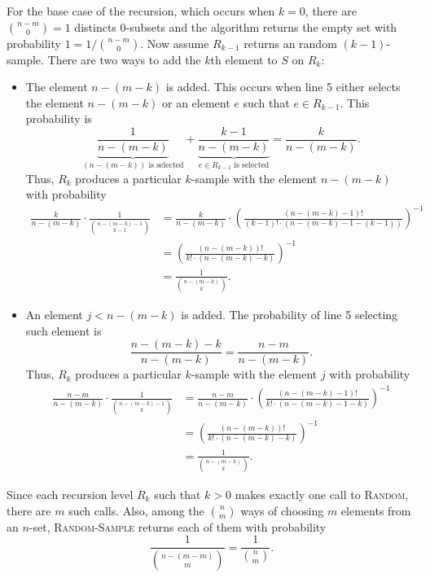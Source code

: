 \begin{enumerate}
\begin{framed}
For the base case of the recursion, which occurs when $k = 0$, there are
$\binom{n - m}{0} = 1$ distincts $0$-subsets and the algorithm returns the empty
set with probability $1 = 1/\binom{n - m}{0}$. Now assume $R_{k - 1}$ returns an
random $(k - 1)$-sample. There are two ways to add the $k$th element to $S$ on
$R_k$:
\begin{itemize}
\item The element $n - (m - k)$ is added. This occurs when line 5 either
selects the element $n - (m - k)$ or an element $e$ such that $e \in R_{k - 1}$.
This probability is
\[
  \underbrace{\frac{1}{n - (m - k)}}_\text{$(n - (m - k))$ is selected} +
  \underbrace{\frac{k - 1}{n - (m - k)}}_\text{$e \in R_{k - 1}$ is selected} = \frac{k}{n - (m - k)}.
\]
Thus, $R_k$ produces a particular $k$-sample with the element $n - (m - k)$ with
probability
\begin{equation*}
\begin{aligned}
  \frac{k}{n - (m - k)} \cdot \frac{1}{\binom{n - (m - k) - 1}{k - 1}}
  &= \frac{k}{n - (m - k)} \cdot \left(\frac{(n - (m - k) - 1)!}{(k - 1)! \cdot (n - (m - k) - 1 - (k - 1))}\right)^{-1}\\
  &= \left(\frac{(n - (m - k))!}{k! \cdot (n - (m - k) - k )}\right)^{-1}\\
  &= \frac{1}{\binom{n - (m - k)}{k}}.
\end{aligned}
\end{equation*}

\item An element $j < n - (m - k)$ is added. The probability of line 5 selecting
such element is
\[
  \frac{n - (m - k) - k}{n - (m - k)} = \frac{n - m}{n - (m - k)}.
\]
Thus, $R_k$ produces a particular $k$-sample with the element $j$ with
probability
\begin{equation*}
\begin{aligned}
  \frac{n - m}{n - (m - k)} \cdot \frac{1}{\binom{n - (m - k) - 1}{k}}
  &= \frac{n - m}{n - (m - k)} \cdot \left(\frac{(n - (m - k) - 1)!}{k! \cdot (n - (m - k) - 1 - k)}\right)^{-1}\\
  &= \left(\frac{(n - (m - k))!}{k! \cdot (n - (m - k) - k)}\right)^{-1}\\
  &= \frac{1}{\binom{n - (m - k)}{k}}.
\end{aligned}
\end{equation*}
\end{itemize}

Since each recursion level $R_k$ such that $k > 0$ makes exactly one
call to \textsc{Random}, there are $m$ such calls. Also, among the
$\binom{n}{m}$ ways of choosing $m$ elements from an $n$-set,
\textsc{Random-Sample} returns each of them with probability
\[
  \frac{1}{\binom{n - (m - m)}{m}} = \frac{1}{\binom{n}{m}}.
\]
\end{framed}

\end{enumerate}

